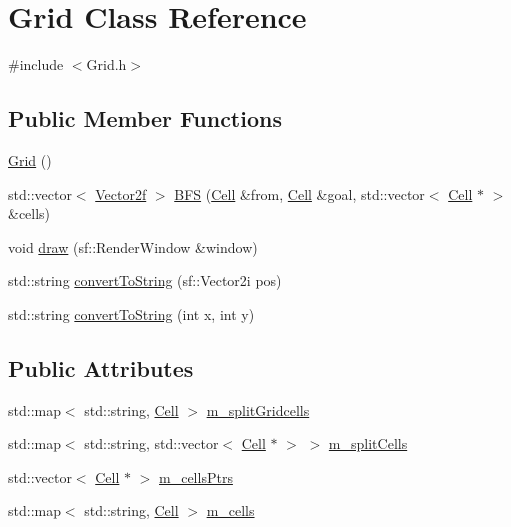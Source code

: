 \hypertarget{class_grid}{}\section{Grid Class Reference}
\label{class_grid}


{\ttfamily \#include $<$Grid.\+h$>$}

\subsection*{Public Member Functions}
\begin{DoxyCompactItemize}
\item 
\mbox{\hyperlink{class_grid_a4ac9ff4f63552b4c61ff90fcb35ad66c}{Grid}} ()
\item 
std\+::vector$<$ \mbox{\hyperlink{class_vector2f}{Vector2f}} $>$ \mbox{\hyperlink{class_grid_af12fcb815f27ae538ac1dd8178c30b6f}{B\+FS}} (\mbox{\hyperlink{class_cell}{Cell}} \&from, \mbox{\hyperlink{class_cell}{Cell}} \&goal, std\+::vector$<$ \mbox{\hyperlink{class_cell}{Cell}} $\ast$ $>$ \&cells)
\item 
void \mbox{\hyperlink{class_grid_a9b42b1d0dcfc434d790b11faf4b461ce}{draw}} (sf\+::\+Render\+Window \&window)
\item 
std\+::string \mbox{\hyperlink{class_grid_a0d44166cb6fff74a173d454023c1cce4}{convert\+To\+String}} (sf\+::\+Vector2i pos)
\item 
std\+::string \mbox{\hyperlink{class_grid_a0bb1f758e9bec3d4f083d52d42fdeedd}{convert\+To\+String}} (int x, int y)
\end{DoxyCompactItemize}
\subsection*{Public Attributes}
\begin{DoxyCompactItemize}
\item 
std\+::map$<$ std\+::string, \mbox{\hyperlink{class_cell}{Cell}} $>$ \mbox{\hyperlink{class_grid_ab2dedb463583b59622965acc2a6bedc7}{m\+\_\+split\+Gridcells}}
\item 
std\+::map$<$ std\+::string, std\+::vector$<$ \mbox{\hyperlink{class_cell}{Cell}} $\ast$ $>$ $>$ \mbox{\hyperlink{class_grid_aaa5f3ec4dfd546d45ba997a89296cad9}{m\+\_\+split\+Cells}}
\item 
std\+::vector$<$ \mbox{\hyperlink{class_cell}{Cell}} $\ast$ $>$ \mbox{\hyperlink{class_grid_ad2fee42b47a1d2fdb9a490ebf52aa944}{m\+\_\+cells\+Ptrs}}
\item 
std\+::map$<$ std\+::string, \mbox{\hyperlink{class_cell}{Cell}} $>$ \mbox{\hyperlink{class_grid_aeb22e641359f6de5c09d58c570d08a1e}{m\+\_\+cells}}
\end{DoxyCompactItemize}


